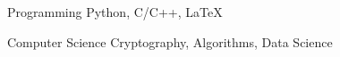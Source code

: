 

\begin{cvskills}

  \cvskill
    {Programming} %
    {Python, C/C++, LaTeX} %

  \cvskill
    {Computer Science} %
    {Cryptography, Algorithms, Data Science} %

\end{cvskills}

